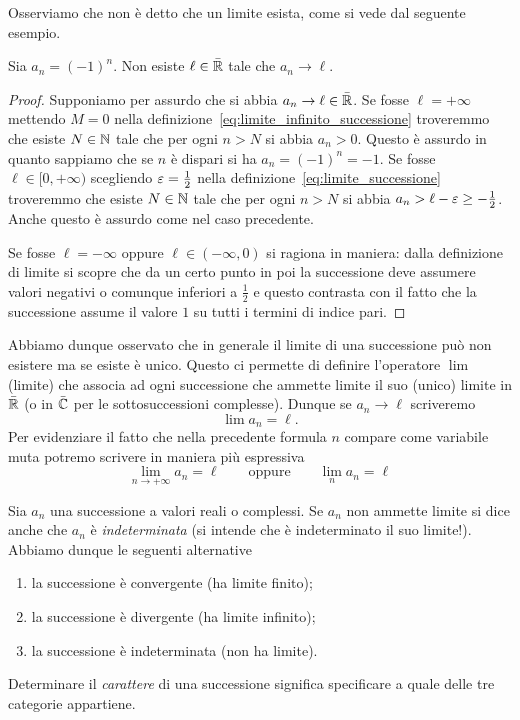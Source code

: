 Osserviamo che non è detto che un limite esista, come si vede dal seguente esempio.

\begin{example}
Sia $a_n = (-1)^n$. Non esiste $\ell \in \bar {\mathbb R}$
tale che $a_n \to \ell$.
\end{example}
\begin{proof}
Supponiamo per assurdo che si abbia $a_n\to \ell\in \bar {\mathbb R}$.
Se fosse $\ell=+\infty$ mettendo $M=0$ nella definizione~\eqref{eq:limite_infinito_successione}
troveremmo che esiste $N\in \mathbb N$ tale che per ogni $n>N$
si abbia $a_n>0$. Questo è assurdo in quanto sappiamo che se
$n$ è dispari si ha $a_n = (-1)^n = -1$.
Se fosse $\ell\in[0,+\infty)$ scegliendo $\varepsilon=\frac 1 2$  nella definizione~\eqref{eq:limite_successione} troveremmo che
esiste $N\in \mathbb N$ tale che per ogni $n>N$ si abbia $a_n > \ell-\varepsilon \ge -\frac 1 2$. Anche questo è assurdo come nel caso precedente.

Se fosse $\ell=-\infty$ oppure $\ell\in (-\infty,0)$ si ragiona
in maniera: dalla definizione di limite si scopre che da un certo punto
in poi la successione deve assumere valori negativi o comunque inferiori a $\frac 1 2$ e questo contrasta con il fatto che la
successione assume il valore $1$ su tutti i termini di indice pari.
\end{proof}

Abbiamo dunque osservato che in generale il limite di una successione può
non esistere ma se esiste è unico.
Questo ci permette di definire l'operatore $\lim$
(limite) che associa ad ogni successione che ammette limite
il suo (unico) limite in $\bar {\mathbb R}$
(o in $\bar {\mathbb C}$ per le sottosuccessioni complesse).
Dunque se $a_n \to \ell$ scriveremo
\[
  \lim a_n = \ell.
\]
Per evidenziare il fatto che nella precedente formula
$n$ compare come variabile muta potremo scrivere
in maniera più espressiva
\[
   \lim_{n\to+\infty} a_n = \ell
   \qquad\text{oppure}\qquad
   \lim_n a_n = \ell
\]

\begin{definition}
\mymark{***}
Sia $a_n$ una successione a valori reali o complessi.
Se $a_n$ non ammette limite
si dice anche che $a_n$ è \emph{indeterminata}
%
(si intende che è indeterminato il suo limite!).
Abbiamo dunque le seguenti alternative
\begin{enumerate}
 \item la successione è convergente (ha limite finito);
 \item la successione è divergente (ha limite infinito);
 \item la successione è indeterminata (non ha limite).
\end{enumerate}
Determinare il \emph{carattere}
%
%
di una successione
significa specificare a quale delle tre categorie appartiene.
\end{definition}


